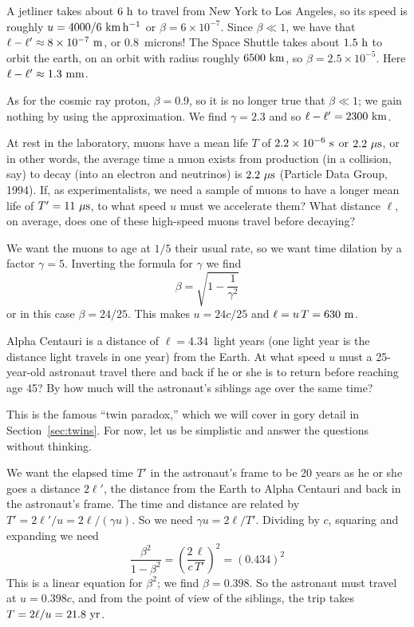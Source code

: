 A jetliner takes about $6~{\rm h}$ to travel from New York to Los
Angeles, so its speed is roughly $u=4000/6~{\rm km\,h^{-1}}$ or $\beta=6\times
10^{-7}$.  Since $\beta\ll 1$, we have that $\ell-\ell'\approx 8\times
10^{-7}~{\rm m}$, or $0.8$~microns!  The Space Shuttle takes about
$1.5~{\rm h}$ to orbit the earth, on an orbit with radius roughly
$6500~{\rm km}$, so $\beta=2.5\times 10^{-5}$.  Here $\ell-\ell'\approx
1.3~{\rm mm}$.

As for the cosmic ray proton, $\beta=0.9$, so it is no longer true
that $\beta\ll 1$; we gain nothing by using the approximation.  We
find $\gamma=2.3$ and so $\ell-\ell'=2300~{\rm km}$.

\begin{problem}
At rest in the laboratory, muons have a mean life $T$ of $2.2\times
10^{-6}~{\rm s}$ or $2.2~{\rm \mu s}$, or in other words, the average
time a muon exists from production (in a collision, say) to decay
(into an electron and neutrinos) is $2.2~{\rm \mu s}$ (Particle Data
Group, 1994).  If, as experimentalists, we need a sample of muons to
have a longer mean life of $T'=11~{\rm \mu s}$, to what speed $u$ must
we accelerate them?  What distance $\ell$, on average, does one of
these high-speed muons travel before decaying?
\end{problem}

We want the muons to age at $1/5$ their usual rate, so we want time
dilation by a factor $\gamma=5$.  Inverting the formula for $\gamma$
we find
\begin{equation}
\beta=\sqrt{1-\frac{1}{\gamma^2}}
\end{equation}
or in this case $\beta=24/25$.  This makes $u=24c/25$ and
$\ell=u\,T=630~{\rm m}$.

\begin{problem}
Alpha Centauri is a distance of $\ell=4.34$~light years (one light
year is the distance light travels in one year) from the Earth.  At
what speed $u$ must a 25-year-old astronaut travel there and back if
he or she is to return before reaching age 45?  By how much will the
astronaut's siblings age over the same time?
\end{problem}

This is the famous ``twin paradox,'' which we will cover in gory
detail in Section~\ref{sec:twins}.  For now, let us be simplistic and
answer the questions without thinking.

We want the elapsed time $T'$ in the astronaut's frame to be 20 years
as he or she goes a distance $2\ell'$, the distance from the Earth to
Alpha Centauri and back in the astronaut's frame.  The time and
distance are related by $T'=2\ell'/u=2\ell/(\gamma u)$.  So we need
$\gamma u=2\ell/T'$.  Dividing by $c$, squaring and expanding we need
\begin{equation}
\frac{\beta^2}{1 - \beta^2} = \left(\frac{2\,\ell}{c\,T'}\right)^2
 = (0.434)^2
\end{equation}
This is a linear equation for $\beta^2$; we find $\beta=0.398$.  So
the astronaut must travel at $u=0.398c$, and from the point of view of
the siblings, the trip takes $T=2\ell /u=21.8~{\rm yr}$.


